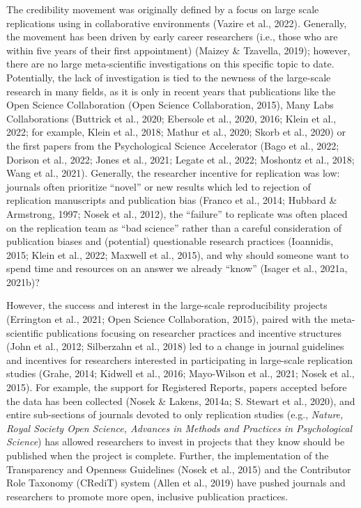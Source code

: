 \documentclass[
  man]{apa7}
\begin{document}
The credibility movement was originally defined by a focus on large
scale replications using in collaborative environments (Vazire et al., 2022).
Generally, the movement has been driven by early career researchers
(i.e., those who are within five years of their first appointment)
(Maizey \& Tzavella, 2019); however, there are no large meta-scientific
investigations on this specific topic to date. Potentially, the lack of
investigation is tied to the newness of the large-scale research in many
fields, as it is only in recent years that publications like the Open
Science Collaboration (Open Science Collaboration, 2015), Many Labs
Collaborations (Buttrick et al., 2020; Ebersole et al., 2020, 2016; Klein et al., 2022; for example, Klein et al., 2018; Mathur et al., 2020; Skorb et al., 2020) or the first papers
from the Psychological Science Accelerator (Bago et al., 2022; Dorison et al., 2022; Jones et al., 2021; Legate et al., 2022; Moshontz et al., 2018; Wang et al., 2021). Generally, the
researcher incentive for replication was low: journals often prioritize
``novel'' or new results which led to rejection of replication manuscripts
and publication bias (Franco et al., 2014; Hubbard \& Armstrong, 1997; Nosek et al., 2012), the
``failure'' to replicate was often placed on the replication team as ``bad
science'' rather than a careful consideration of publication biases and
(potential) questionable research practices (Ioannidis, 2015; Klein et al., 2022; Maxwell et al., 2015), and why should someone want to spend time and
resources on an answer we already ``know'' (Isager et al., 2021a, 2021b)?

However, the success and interest in the large-scale reproducibility
projects (Errington et al., 2021; Open Science Collaboration, 2015), paired
with the meta-scientific publications focusing on researcher practices
and incentive structures (John et al., 2012; Silberzahn et al., 2018) led to a
change in journal guidelines and incentives for researchers interested
in participating in large-scale replication studies (Grahe, 2014; Kidwell et al., 2016; Mayo-Wilson et al., 2021; Nosek et al., 2015). For example, the support
for Registered Reports, papers accepted before the data has been
collected (Nosek \& Lakens, 2014a; S. Stewart et al., 2020), and entire sub-sections of
journals devoted to only replication studies (e.g., \emph{Nature, Royal
Society Open Science, Advances in Methods and Practices in Psychological
Science}) has allowed researchers to invest in projects that they know
should be published when the project is complete. Further, the
implementation of the Transparency and Openness Guidelines (Nosek et al., 2015)
and the Contributor Role Taxonomy (CRediT) system (Allen et al., 2019) have
pushed journals and researchers to promote more open, inclusive
publication practices.
\end{document}

